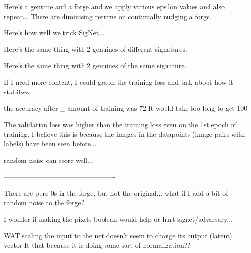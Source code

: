 Here's a genuine and a forge and we apply various epsilon values and also repeat...
    There are diminising returns on continually nudging a forge.

Here's how well we trick SigNet...

Here's the same thing with 2 genuines of different signatures.

Here's the same thing with 2 genuines of the same signature.


If I need more content, I could graph the training loss and talk about how it stabilzes.

the accuracy after \_ amount of training was 72%
It would take too long to get 100%

The validation loss was higher than the training loss even on the 1st epoch of training.
I believe this is because the images in the datapoints (image pairs with labels) have been seen before...


random noise can score well...

-------------------------------------------------

There are pure 0s in the forge, but not the original...
what if I add a bit of random noise to the forge?

I wonder if making the pixels boolean would help or hurt signet/advarsary...





WAT
    scaling the input to the net doesn't seem to change its output (latent) vector
    It that because it is doing some sort of normalization??

